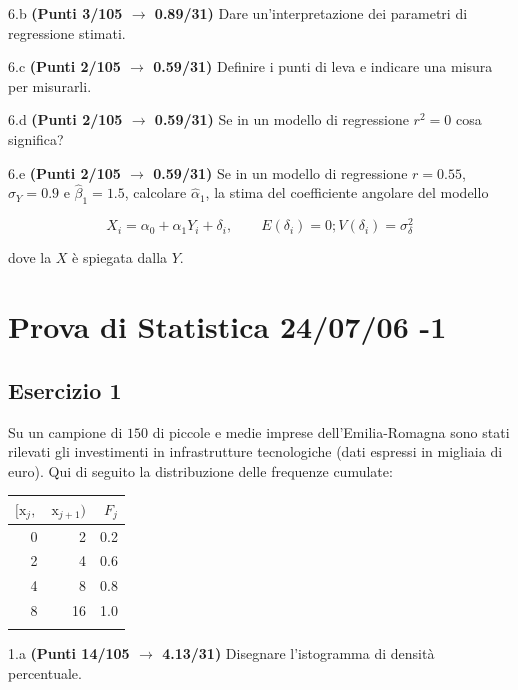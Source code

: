 \documentclass[
  11pt,
]{book}
\theoremstyle{mytheoremstyle}
\theoremstyle{mydefstyle}
\begin{document}
6.b \textbf{(Punti 3/105 \(\rightarrow\) 0.89/31)} Dare un'interpretazione dei parametri di regressione stimati.

6.c \textbf{(Punti 2/105 \(\rightarrow\) 0.59/31)} Definire i punti di leva e indicare una misura per misurarli.

6.d \textbf{(Punti 2/105 \(\rightarrow\) 0.59/31)} Se in un modello di regressione \(r^2=0\) cosa significa?

6.e \textbf{(Punti 2/105 \(\rightarrow\) 0.59/31)} Se in un modello di regressione \(r=0.55\), \(\hat\sigma_Y=0.9\) e \(\hat\beta_1=1.5\), calcolare
\(\hat\alpha_1\), la stima del coefficiente angolare del modello

\[
X_i = \alpha_0+\alpha_1 Y_i + \delta_i, \qquad E(\delta_i)=0; V(\delta_i)=\sigma_\delta^2
\]

dove la \(X\) è spiegata dalla \(Y\).

\section{Prova di Statistica 24/07/06 -1}\label{prova-di-statistica-240706--1}

\subsection{Esercizio 1}\label{esercizio-1-40}

Su un campione di \(150\) di piccole e medie imprese dell'Emilia-Romagna sono stati rilevati gli investimenti in infrastrutture tecnologiche (dati espressi in migliaia di euro). Qui di seguito la distribuzione delle frequenze cumulate:

\begin{table}[H]
\centering
\begin{tabular}{rrr}
\toprule
$[\text{x}_j,$ & $\text{x}_{j+1})$ & $F_j$\\
\midrule
0 & 2 & 0.2\\
2 & 4 & 0.6\\
4 & 8 & 0.8\\
8 & 16 & 1.0\\
 &  & \\
\bottomrule
\end{tabular}
\end{table}

1.a \textbf{(Punti 14/105 \(\rightarrow\) 4.13/31)} Disegnare l'istogramma di densità percentuale.
\end{document}
